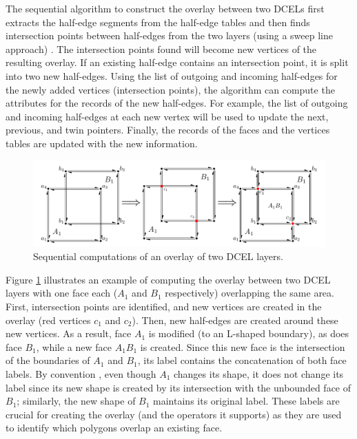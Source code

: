 The sequential algorithm \cite{fogel_cgal_2012} to construct the overlay between two DCELs first extracts the half-edge segments from the half-edge tables and then finds intersection points between half-edges from the two layers (using a sweep line approach) \cite{berg_computational_2008}. The intersection points found will become new vertices of the resulting overlay. If an existing half-edge contains an intersection point, it is split into two new half-edges. Using the list of outgoing and incoming half-edges for the newly added vertices (intersection points), the algorithm can compute the attributes for the records of the new half-edges. For example, the list of outgoing and incoming half-edges at each new vertex will be used to update the next, previous, and twin pointers. Finally, the records of the faces and the vertices tables are updated with the new information. 

\begin{figure}
    \centering
    \includegraphics[width=\linewidth]{chapter2/dcel2}
    \caption{Sequential computations of an overlay of two DCEL layers.}\label{fig:dcel_seq}
\end{figure}

Figure \ref{fig:dcel_seq} illustrates an example of computing the overlay between two DCEL layers with one face each ($A_1$ and $B_1$ respectively) overlapping the same area. First, intersection points are identified, and new vertices are created in the overlay (red vertices $c_1$ and $c_2$). Then, new half-edges are created around these new vertices. As a result, face $A_1$ is modified (to an L-shaped boundary), as does face $B_1$, while a new face $A_1B_1$ is created. Since this new face is the intersection of the boundaries of $A_1$ and $B_1$, its label contains the concatenation of both face labels. By convention \cite{berg_computational_2008}, even though $A_1$ changes its shape, it does not change its label since its new shape is created by its intersection with the unbounded face of $B_1$; similarly, the new shape of $B_1$ maintains its original label. These labels are crucial for creating the overlay (and the operators it supports) as they are used to identify which polygons overlap an existing face.

